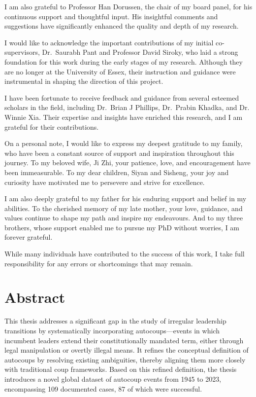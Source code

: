 \documentclass[
  12pt,
]{report}
\begin{document}
I am also grateful to Professor Han Dorussen, the chair of my board
panel, for his continuous support and thoughtful input. His insightful
comments and suggestions have significantly enhanced the quality and
depth of my research.

I would like to acknowledge the important contributions of my initial
co-supervisors, Dr.~Saurabh Pant and Professor David Siroky, who laid a
strong foundation for this work during the early stages of my research.
Although they are no longer at the University of Essex, their
instruction and guidance were instrumental in shaping the direction of
this project.

I have been fortunate to receive feedback and guidance from several
esteemed scholars in the field, including Dr.~Brian J Phillips,
Dr.~Prabin Khadka, and Dr. Winnie Xia. Their expertise and insights have
enriched this research, and I am grateful for their contributions.

On a personal note, I would like to express my deepest gratitude to my
family, who have been a constant source of support and inspiration
throughout this journey. To my beloved wife, Ji Zhi, your patience,
love, and encouragement have been immeasurable. To my dear children,
Siyan and Sisheng, your joy and curiosity have motivated me to persevere
and strive for excellence.

I am also deeply grateful to my father for his enduring support and
belief in my abilities. To the cherished memory of my late mother, your
love, guidance, and values continue to shape my path and inspire my
endeavours. And to my three brothers, whose support enabled me to pursue
my PhD without worries, I am forever grateful.

While many individuals have contributed to the success of this work, I
take full responsibility for any errors or shortcomings that may remain.

\chapter*{Abstract}\label{abstract}

This thesis addresses a significant gap in the study of irregular
leadership transitions by systematically incorporating
autocoups---events in which incumbent leaders extend their
constitutionally mandated term, either through legal manipulation or
overtly illegal means. It refines the conceptual definition of autocoups
by resolving existing ambiguities, thereby aligning them more closely
with traditional coup frameworks. Based on this refined definition, the
thesis introduces a novel global dataset of autocoup events from 1945 to
2023, encompassing 109 documented cases, 87 of which were successful.
\end{document}
